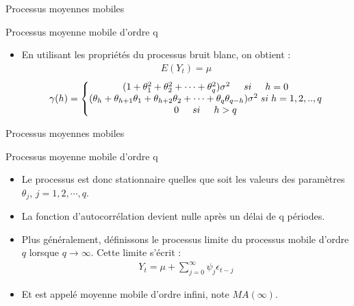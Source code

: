 \documentclass{beamer}
\begin{document}
\begin{frame}{Processus moyennes mobiles}
\begin{block}{Processus moyenne mobile d’ordre q}
\begin{itemize}
\item En utilisant les propriétés du processus bruit blanc, on obtient :
\begin{align*}
E(Y_t)=\mu
\end{align*}
\begin{align*}
\gamma(h)=\left\{\begin{matrix}
(1+\theta_1^2+\theta_2^2+\cdots+\theta_q^2)\sigma^2 \hspace{0.5cm} si \hspace{0.5cm} h=0  \\ 
(\theta_h+\theta_{h+1}\theta_1+\theta_{h+2}\theta_2+\cdots+\theta_q\theta_{q-h})\sigma^2 \hspace{0.1cm} si\hspace{0.1cm}h=1,2,..,q  \\ 
0  \hspace{0.5cm} si \hspace{0.5cm} h>q  
\end{matrix}\right.
\end{align*}
\end{itemize}
\end{block}
\end{frame}



\begin{frame}{Processus moyennes mobiles}
\begin{block}{Processus moyenne mobile d’ordre q}
\begin{itemize}
\item Le processus est donc stationnaire quelles que soit les valeurs des paramètres $\theta_j$, $j = 1, 2, \cdots, q$. 
\item La fonction d’autocorrélation devient nulle après un délai de q périodes.
\item Plus généralement, définissons le processus limite du processus mobile d’ordre $q$ lorsque $q \rightarrow \infty$. Cette limite s’écrit :
\begin{align*}
Y_t=\mu+\sum_{j=0}^{\infty} \psi_j \epsilon_{t-j}
\end{align*}
\item Et est appelé moyenne mobile d’ordre infini, note $MA(\infty)$.
\end{itemize}

\end{block}
\end{frame}
\end{document}
